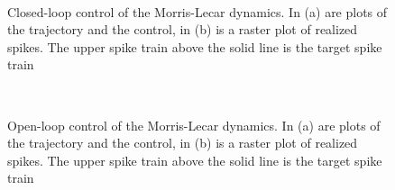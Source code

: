 \begin{figure}[h]
\begin{center}
\\
\caption[Closed-loop control of Morris-Lecar model]{Closed-loop control of the
Morris-Lecar dynamics. In (a) are plots of the trajectory and the control, in (b)
  is a raster plot of realized spikes. The upper spike train above the
solid line is the target spike train}
\label{fig:ML_controled_simulation_cl}
\end{center}
\end{figure} 
\begin{figure}[h] 
\begin{center}
\\
\caption[Open-loop control of Morris-Lecar model]{Open-loop control of the
Morris-Lecar dynamics. In (a) are plots of the trajectory and the control, in (b)
  is a raster plot of realized spikes. The upper spike train above the
solid line is the target spike train}
\label{fig:ML_controled_simulation_ol}
\end{center}
\end{figure} 

\clearpage 


